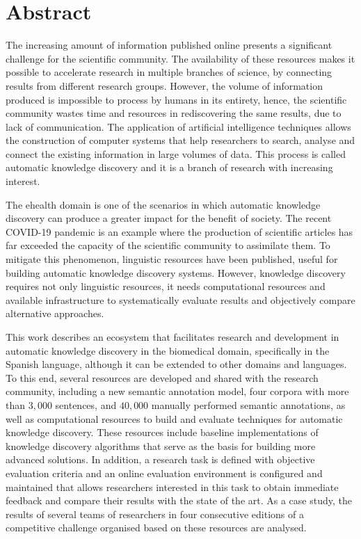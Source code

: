 \chapter*{Abstract}

The increasing amount of information published online presents a significant challenge for the scientific community. The availability of these resources makes it possible to accelerate research in multiple branches of science, by connecting results from different research groups. However, the volume of information produced is impossible to process by humans in its entirety, hence, the scientific community wastes time and resources in rediscovering the same results, due to lack of communication. The application of artificial intelligence techniques allows the construction of computer systems that help researchers to search, analyse and connect the existing information in large volumes of data. This process is called automatic knowledge discovery and it is a branch of research with increasing interest.

The ehealth domain is one of the scenarios in which automatic knowledge discovery can produce a greater impact for the benefit of society. The recent COVID-19 pandemic is an example where the production of scientific articles has far exceeded the capacity of the scientific community to assimilate them. To mitigate this phenomenon, linguistic resources have been published, useful for building automatic knowledge discovery systems.
However, knowledge discovery requires not only linguistic resources, it needs computational resources and available infrastructure to systematically evaluate results and objectively compare alternative approaches.

This work describes an ecosystem that facilitates research and development in automatic knowledge discovery in the biomedical domain, specifically in the Spanish language, although it can be extended to other domains and languages. To this end, several resources are developed and shared with the research community, including a new semantic annotation model, four corpora with more than $3,000$ sentences, and $40,000$ manually performed semantic annotations, as well as computational resources to build and evaluate techniques for automatic knowledge discovery.
These resources include baseline implementations of knowledge discovery algorithms that serve as the basis for building more advanced solutions.
In addition, a research task is defined with objective evaluation criteria and an online evaluation environment is configured and maintained that allows researchers interested in this task to obtain immediate feedback and compare their results with the state of the art.
As a case study, the results of several teams of researchers in four consecutive editions of a competitive challenge organised based on these resources are analysed.

